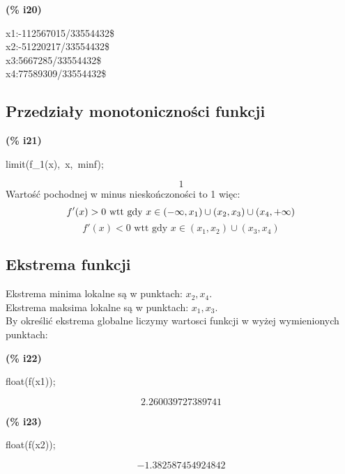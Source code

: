 \documentclass[a4paper]{article}
\begin{document}
\noindent
\begin{minipage}[t]{4.000000em}\color{red}\bfseries
(\% i20)	
\end{minipage}
\begin{minipage}[t]{\textwidth}\color{blue}
x1:-112567015/33554432\$\\
x2:-51220217/33554432\$\\
x3:5667285/33554432\$\\
x4:77589309/33554432\$
\end{minipage}

\noindent%

\subsection{Przedziały monotoniczności funkcji}


\noindent
\begin{minipage}[t]{4.000000em}\color{red}\bfseries
(\% i21)	
\end{minipage}
\begin{minipage}[t]{\textwidth}\color{blue}
limit(f\_1(x),\ x,\ minf);
\end{minipage}
\[\displaystyle \tag{\% o21} 
1\mbox{}
\]
Wartość pochodnej w minus nieskończoności to 1 więc:
$$f'(x)>0 \mbox{ wtt gdy } x \in (-\infty,x_1)\cup(x_2,x_3)\cup(x_4,+\infty) \\$$
$$f'(x)<0 \mbox{ wtt gdy } x \in (x_1,x_2) \cup (x_3,x_4)$$
\subsection{Ekstrema funkcji}
Ekstrema minima lokalne są w punktach: $x_2, x_4$.\\
Ekstrema maksima lokalne są w punktach: $x_1, x_3$.\\
By określić ekstrema globalne liczymy wartosci funkcji w wyżej wymienionych punktach:

\noindent
\begin{minipage}[t]{4.000000em}\color{red}\bfseries
(\% i22)	
\end{minipage}
\begin{minipage}[t]{\textwidth}\color{blue}
float(f(x1));
\end{minipage}
\[\displaystyle \tag{\% o22} 
2.260039727389741\mbox{}
\]


\noindent
\begin{minipage}[t]{4.000000em}\color{red}\bfseries
(\% i23)	
\end{minipage}
\begin{minipage}[t]{\textwidth}\color{blue}
float(f(x2));
\end{minipage}
\[\displaystyle \tag{\% o23} 
-1.382587454924842\mbox{}
\]
\end{document}
